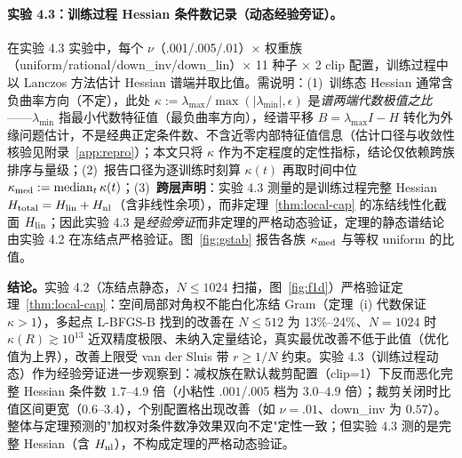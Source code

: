 \documentclass[fontset=windows,11pt]{ctexart}
\numberwithin{equation}{section}
\begin{document}
\paragraph{实验 4.3：训练过程 Hessian 条件数记录（动态经验旁证）。}
在实验 4.3 实验中，每个 $\nu$（.001/.005/.01）× 权重族（uniform/rational/down\_inv/down\_lin）× 11 种子 × 2 clip 配置，训练过程中以 Lanczos 方法估计 Hessian 谱端并取比值。需说明：(1)~训练态 Hessian 通常含负曲率方向（不定），此处 $\kappa:=\lambda_{\max}/\max(|\lambda_{\min}|,\epsilon)$ 是\emph{谱两端代数极值之比}——$\lambda_{\min}$ 指最小代数特征值（最负曲率方向），经谱平移 $B=\lambda_{\max}I-H$ 转化为外缘问题估计，不是经典正定条件数、不含近零内部特征值信息（估计口径与收敛性核验见附录~\ref{app:repro}）；本文只将 $\kappa$ 作为不定程度的定性指标，结论仅依赖跨族排序与量级；(2)~报告口径为逐训练时刻算 $\kappa(t)$ 再取时间中位 $\kappa_{\rm med}:=\operatorname{median}_t\kappa(t)$；(3)~\textbf{跨层声明}：实验 4.3 测量的是训练过程完整 Hessian $H_{\rm total}=H_{\rm lin}+H_{\rm nl}$（含非线性余项），而非定理~\ref{thm:local-cap} 的冻结线性化截面 $H_{\rm lin}$；因此实验 4.3 是\emph{经验旁证}而非定理的严格动态验证，定理的静态谱结论由实验 4.2 在冻结点严格验证。图~\ref{fig:gstab} 报告各族 $\kappa_{\rm med}$ 与等权 uniform 的比值。

\noindent\textbf{结论。}实验 4.2（冻结点静态，$N\le1024$ 扫描，图~\ref{fig:f1d}）严格验证定理~\ref{thm:local-cap}：空间局部对角权不能白化冻结 Gram（定理~(i) 代数保证 $\kappa>1$），多起点 L-BFGS-B 找到的改善在 $N\le512$ 为 13\%--24\%、$N=1024$ 时 $\kappa(R)\gtrsim10^{13}$ 近双精度极限、未纳入定量结论，真实最优改善不低于此值（优化值为上界），改善上限受 van der Sluis 带 $r\ge1/N$ 约束。实验 4.3（训练过程动态）作为经验旁证进一步观察到：减权族在默认裁剪配置（clip=1）下反而恶化完整 Hessian 条件数 $1.7$--$4.9$ 倍（小粘性 $.001$/.005 档为 $3.0$--$4.9$ 倍）；裁剪关闭时比值区间更宽（$0.6$--$3.4$），个别配置格出现改善（如 $\nu=.01$、down\_inv 为 $0.57$）。整体与定理预测的"加权对条件数净效果双向不定"定性一致；但实验 4.3 测的是完整 Hessian（含 $H_{\rm nl}$），不构成定理的严格动态验证。
\end{document}
